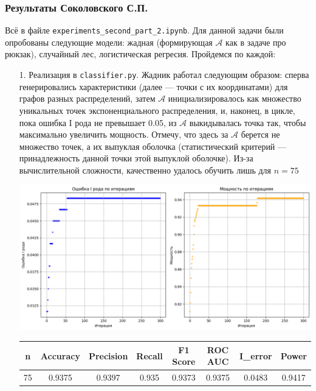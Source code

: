 \documentclass[a4paper,12pt]{article}
\begin{document}
\subsubsection*{Результаты Соколовского С.П.}
Всё в файле \texttt{experiments\_second\_part\_2.ipynb}.
Для данной задачи были опробованы следующие модели: жадная (формирующая $\mathcal{A}$ как в задаче про рюкзак), случайный лес, логистическая регресия. Пройдемся по каждой:
\begin{itemize}
    \item[1.] Реализация в \texttt{classifier.py}. Жадник работал следующим образом: сперва генерировались характеристики (далее --- точки с их координатами) для графов разных распределений, затем $\mathcal{A}$ инициализировалось как множество уникальных точек экспоненциального распределения, и, наконец, в цикле, пока ошибка I рода не превышает 0.05, из $\mathcal{A}$ выкидывалась точка так, чтобы максимально увеличить мощность. Отмечу, что здесь за $\mathcal{A}$ берется не множество точек, а их выпуклая оболочка (статистический критерий --- принадлежность данной точки этой выпуклой оболочке). Из-за вычислительной сложности, качественно удалось обучить лишь для $n = 75$
    \begin{center}
    \hspace{-2cm} %
    \includegraphics[width=\textwidth]{images/erros_powers.png}
    \hspace{+2cm} %
    \end{center}
    \begin{table}
    \centering
    \begin{tabular}{|c|c|c|c|c|c|c|c|}
        \hline
        n & Accuracy & Precision & Recall & F1 Score & ROC AUC & I\_error & Power \\
        \hline
        75 & 0.9375 & 0.9397 & 0.935 & 0.9373 & 0.9375 & 0.0483 & 0.9417 \\

\end{tabular}
\end{table}
\end{itemize}
\end{document}
